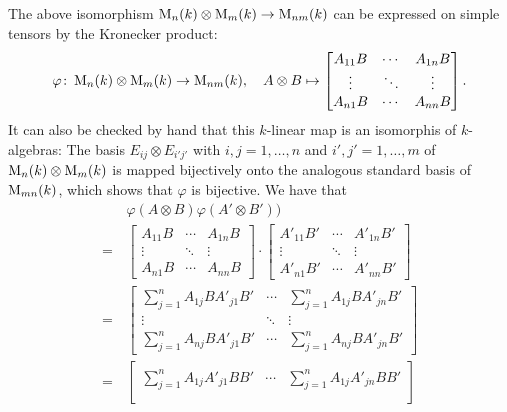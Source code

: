 \begin{remark}
  The above isomorphism $\operatorname{M}_n(k) \otimes \operatorname{M}_m(k) \to \operatorname{M}_{nm}(k)$ can be expressed on simple tensors by the Kronecker product:
  \[
            \varphi
    \colon  \operatorname{M}_n(k) \otimes \operatorname{M}_m(k)
    \to     \operatorname{M}_{nm}(k),
    \quad   A \otimes B
    \mapsto \begin{bmatrix}
              A_{11} B  & \cdots  & A_{1n} B  \\
              \vdots    & \ddots  & \vdots    \\
              A_{n1} B  & \cdots  & A_{nn} B
            \end{bmatrix}.
  \]
  It can also be checked by hand that this $k$-linear map is an isomorphis of $k$-algebras:
  The basis $E_{ij} \otimes E_{i'j'}$ with $i,j = 1, \dotsc, n$ and $i', j' = 1, \dotsc, m$ of $\operatorname{M}_n(k) \otimes \operatorname{M}_m(k)$ is mapped bijectively onto the analogous standard basis of $\operatorname{M}_{mn}(k)$, which shows that $\varphi$ is bijective.
  We have that
  \begin{align*}
      &\,  \varphi(A \otimes B) \varphi(A' \otimes B'))
    \\
    =&\,  \begin{bmatrix}
            A_{11} B  & \cdots  & A_{1n} B  \\
            \vdots    & \ddots  & \vdots    \\
            A_{n1} B  & \cdots  & A_{nn} B
          \end{bmatrix}
          \cdot
          \begin{bmatrix}
            A'_{11} B'  & \cdots  & A'_{1n} B'  \\
            \vdots      & \ddots  & \vdots      \\
            A'_{n1} B'  & \cdots  & A'_{nn} B'
          \end{bmatrix}
    \\
    =&\,  \begin{bmatrix}
            \sum_{j=1}^n A_{1j} B A'_{j1} B'  & \cdots  & \sum_{j=1}^n A_{1j} B A'_{jn} B'  \\
            \vdots                            & \ddots  & \vdots                            \\
            \sum_{j=1}^n A_{nj} B A'_{j1} B'  & \cdots  & \sum_{j=1}^n A_{nj} B A'_{jn} B'
          \end{bmatrix}
    \\
    =&\,  \begin{bmatrix}
            \sum_{j=1}^n A_{1j} A'_{j1} B B'  & \cdots  & \sum_{j=1}^n A_{1j} A'_{jn} B B'  \\

\end{bmatrix}
\end{align*}
\end{remark}
